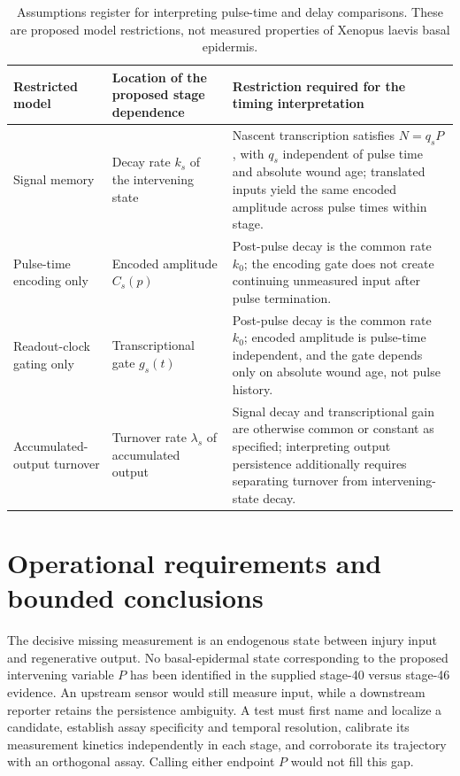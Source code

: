 \documentclass[11pt]{article}
\begin{document}
\begin{table}[!htbp]
\centering\small
\caption{Assumptions register for interpreting pulse-time and delay comparisons. These are proposed model restrictions, not measured properties of Xenopus laevis basal epidermis.}
\begin{tabular}{@{}>{\raggedright\arraybackslash}p{}>{\raggedright\arraybackslash}p{}>{\raggedright\arraybackslash}p{}@{}}
\toprule
\textbf{Restricted model} & \textbf{Location of the proposed stage dependence} & \textbf{Restriction required for the timing interpretation}\\
\midrule
Signal memory & Decay rate $k_s$ of the intervening state & Nascent transcription satisfies $N=q_sP$, with $q_s$ independent of pulse time and absolute wound age; translated inputs yield the same encoded amplitude across pulse times within stage.\\
Pulse-time encoding only & Encoded amplitude $C_s(p)$ & Post-pulse decay is the common rate $k_0$; the encoding gate does not create continuing unmeasured input after pulse termination.\\
Readout-clock gating only & Transcriptional gate $g_s(t)$ & Post-pulse decay is the common rate $k_0$; encoded amplitude is pulse-time independent, and the gate depends only on absolute wound age, not pulse history.\\
Accumulated-output turnover & Turnover rate $\lambda_s$ of accumulated output & Signal decay and transcriptional gain are otherwise common or constant as specified; interpreting output persistence additionally requires separating turnover from intervening-state decay.\\
\bottomrule
\end{tabular}
\par{}
\end{table}
\section{Operational requirements and bounded conclusions}
The decisive missing measurement is an endogenous state between injury input and regenerative output. No basal-epidermal state corresponding to the proposed intervening variable $P$ has been identified in the supplied stage-40 versus stage-46 evidence. An upstream sensor would still measure input, while a downstream reporter retains the persistence ambiguity. A test must first name and localize a candidate, establish assay specificity and temporal resolution, calibrate its measurement kinetics independently in each stage, and corroborate its trajectory with an orthogonal assay. Calling either endpoint $P$ would not fill this gap.
\end{document}
